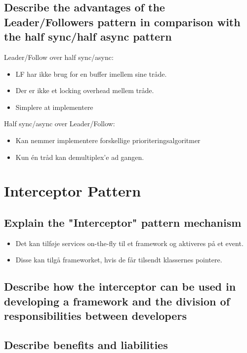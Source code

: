 \documentclass{article}
\begin{document}
\subsection{Describe the advantages of the Leader/Followers pattern in comparison with the half sync/half async pattern}

Leader/Follow over half sync/async:
\vspace{-10pt}
\begin{itemize}
	\item LF har ikke brug for en buffer imellem sine tråde.
	\item Der er ikke et locking overhead mellem tråde.
	\item Simplere at implementere
\end{itemize}

Half sync/async over Leader/Follow:
\vspace{-10pt}
\begin{itemize}
	\item Kan nemmer implementere forskellige prioriteringsalgoritmer
	\item Kun én tråd kan demultiplex'e ad gangen.
\end{itemize}





\newpage
\section{Interceptor Pattern}

\subsection{Explain the "Interceptor" pattern mechanism}
\begin{itemize}
	\item Det kan tilføje services on-the-fly til et framework og aktiveres på et event.
	\item Disse kan tilgå frameworket, hvis de får tilsendt klassernes pointere.
\end{itemize}


\subsection{Describe how the interceptor can be used in developing a framework and the division of responsibilities between developers}


\subsection{Describe benefits and liabilities}
\end{document}
